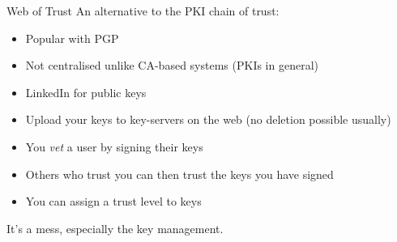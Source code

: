 \begin{frame}{Web of Trust}
  An alternative to the PKI chain of trust:
  \begin{itemize}[<+(1)->]
    \item Popular with PGP
    \item Not centralised unlike CA-based systems (PKIs in general)
    \item LinkedIn for public keys
    \item Upload your keys to key-servers on the web (no deletion possible usually)
    \item You \emph{vet} a user by signing their keys
    \item Others who trust you can then trust the keys you have signed
    \item You can assign a trust level to keys
  \end{itemize}

  \pause
  It's a mess, especially the key management.
\end{frame}



